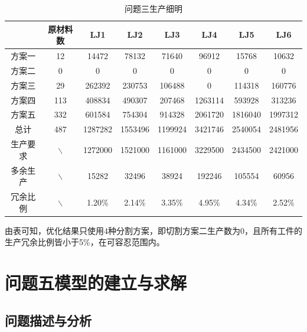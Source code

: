 \documentclass{whutmod}
\begin{document}
 \begin{table}[H]
 	\setstretch{}  %
 	\centering		
 	\caption{问题三生产细明}\label{zhuanssssdasasgzai}
 	\begin{tabular}{cccccccc}
 		\toprule[2pt]
 		\multicolumn{1}{m{2cm}}{\centering }
 		& \multicolumn{1}{m{2cm}}{\centering 原材料数}
 		& \multicolumn{1}{m{1cm}}{\centering LJ1}
 		& \multicolumn{1}{m{1cm}}{\centering LJ2}
 		& \multicolumn{1}{m{1cm}}{\centering LJ3}
 		& \multicolumn{1}{m{1cm}}{\centering LJ4}
 		& \multicolumn{1}{m{1cm}}{\centering LJ5}
 		& \multicolumn{1}{m{1cm}}{\centering LJ6}
 		\\
 		\midrule[1pt]
 		方案一 & 12 &  14472     &  78132  &     71640   &    96912 &      15768    &   10632\\ 
 		方案二 & 0&  0   &  0 &      0 &     0 &     0    &       0\\ 
 		方案三 & 29& 262392   &   230753   &   106488    &       0   &   114318    &  160776\\ 
 		方案四&  113&   408834 &     490307 &     207468 &    1263114&      593928    &  313236\\ 
 		方案五 & 332 & 601584   &   754304  &    914328 &    2061720&     1816040 &    1997312\\ 
 		总计 &487 &  1287282  &   1553496  &   1199924   &  3421746   &  2540054   &  2481956\\ 
 		生产要求 &$\backslash$ & 1272000&1521000 &1161000 & 3229500&2434500 & 2421000\\ 
 		多余生产 &$\backslash$ &  15282    &   32496   &   38924     & 192246    &  105554    &   60956\\
 		冗余比例 &$\backslash$&  1.20\%   & 2.14\% &   3.35\%   & 4.95\% &  4.34\%   & 2.52\% \\ 
 		\bottomrule[2pt]	
 	\end{tabular}
 \end{table}
 由表可知，优化结果只使用$4$种分割方案，即切割方案二生产数为$0$，且所有工件的生产冗余比例皆小于5\%，在可容忍范围内。
  	
  	    \section{问题五模型的建立与求解}
  	\subsection{问题描述与分析}
  	
  	
  	
\end{document}
